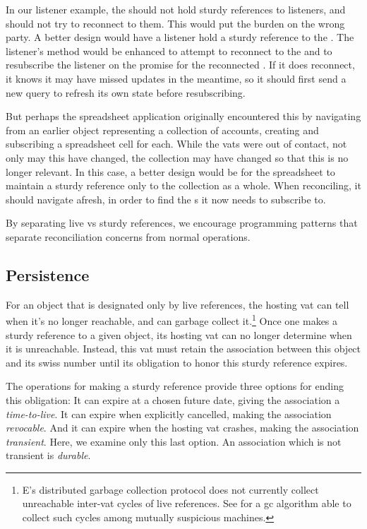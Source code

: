 \documentclass{llncs}
\begin{document}
In our listener example, the  should not hold
sturdy references to listeners, and should not try to reconnect to
them. This would put the burden on the wrong party. A better design
would have a listener hold a sturdy reference to the
. The listener's 
method would be enhanced to attempt to reconnect to the
 and to resubscribe the listener on the promise for
the reconnected . If it does reconnect, it knows it
may have missed updates in the meantime, so it should first send a new
 query to refresh its own state before resubscribing.

But perhaps the spreadsheet application originally encountered this
 by navigating from an earlier object representing
a collection of accounts, creating and subscribing a spreadsheet cell
for each. While the vats were out of contact, not only may this
 have changed, the collection may have changed so
that this  is no longer relevant. In this case, a
better design would be for the spreadsheet to maintain a sturdy
reference only to the collection as a whole. When reconciling, it
should navigate afresh, in order to find the s it
now needs to subscribe to.

By separating live vs sturdy references, we encourage programming
patterns that separate reconciliation concerns from normal operations.

\subsection{Persistence}

For an object that is designated only by live references, the hosting
vat can tell when it's no longer reachable, and can garbage collect
it.\footnote{
%
E's distributed garbage collection protocol does not currently collect
unreachable inter-vat cycles of live references. See \cite{bejar:gc}
for a gc algorithm able to collect such cycles among mutually
suspicious machines.}
%
Once one makes a sturdy reference to a given object, its hosting vat
can no longer determine when it is unreachable. Instead, this vat must
retain the association between this object and its swiss number until
its obligation to honor this sturdy reference expires.

The operations for making a sturdy reference provide three options for
ending this obligation: It can expire at a chosen future date, giving
the association a \emph{time-to-live}. It can expire when explicitly
cancelled, making the association \emph{revocable}. And it can expire
when the hosting vat crashes, making the association
\emph{transient}. Here, we examine only this last option. An
association which is not transient is \emph{durable}.
\end{document}
